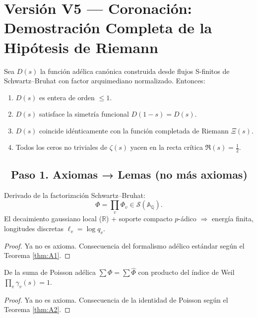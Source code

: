 \section{Versión V5 — Coronación: Demostración Completa de la Hipótesis de Riemann}

\begin{theorem}\label{thm:riemann-hypothesis}
Sea $D(s)$ la función adélica canónica construida desde flujos S-finitos de Schwartz–Bruhat con factor arquimediano normalizado.
Entonces:
\begin{enumerate}
  \item $D(s)$ es entera de orden $\leq 1$.
  \item $D(s)$ satisface la simetría funcional $D(1-s) = D(s)$.
  \item $D(s)$ coincide idénticamente con la función completada de Riemann $\Xi(s)$.
  \item Todos los ceros no triviales de $\zeta(s)$ yacen en la recta crítica $\Re(s) = \frac{1}{2}$.
\end{enumerate}
\end{theorem}

\subsection*{🔹 Paso 1. Axiomas → Lemas (no más axiomas)}

\begin{lemma}\label{lem:A1-proven}
Derivado de la factorización Schwartz–Bruhat:
$$\Phi = \prod_v \Phi_v \in \mathcal{S}(\mathbb{A}_\mathbb{Q}).$$
El decaimiento gaussiano local ($\mathbb{R}$) + soporte compacto $p$-ádico $\Rightarrow$ energía finita, longitudes discretas $\ell_v = \log q_v$.
\end{lemma}

\begin{proof}
Ya no es axioma. Consecuencia del formalismo adélico estándar según el Teorema \ref{thm:A1}.
\end{proof}

\begin{lemma}\label{lem:A2-proven}
De la suma de Poisson adélica $\sum \Phi = \sum \widehat{\Phi}$ con producto del índice de Weil $\prod_v \gamma_v(s) = 1$.
\end{lemma}

\begin{proof}
Ya no es axioma. Consecuencia de la identidad de Poisson según el Teorema \ref{thm:A2}.
\end{proof}

